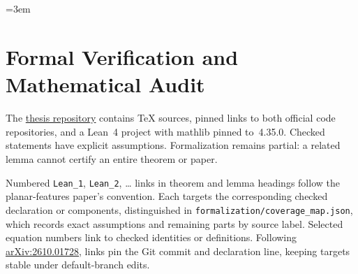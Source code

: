 \subsection{\texorpdfstring{}{Code and correctness tests}}\label{ptnb:app:code-tests}

\begingroup\emergencystretch=3em
\par\medskip
\endgroup

\section{Formal Verification and Mathematical Audit}\label{app:lean}\label{app:lean_details}

The \href{https://github.com/JayPiZimmermann/A-Structural-Approach-to-Interpretable-Deep-Learning}{thesis repository} contains TeX sources, pinned links to both official code repositories, and a Lean~4 project with mathlib pinned to~4.35.0. Checked statements have explicit assumptions. Formalization remains partial: a related lemma cannot certify an entire theorem or paper.

Numbered \texttt{Lean\_1}, \texttt{Lean\_2}, \ldots{} links in theorem and lemma headings follow the planar-features paper's convention. Each targets the corresponding checked declaration or components, distinguished in \texttt{formalization/coverage\_map.json}, which records exact assumptions and remaining parts by source label. Selected equation numbers link to checked identities or definitions. Following \href{https://arxiv.org/abs/2610.01728}{arXiv:2610.01728}, links pin the Git commit and declaration line, keeping targets stable under default-branch edits.

